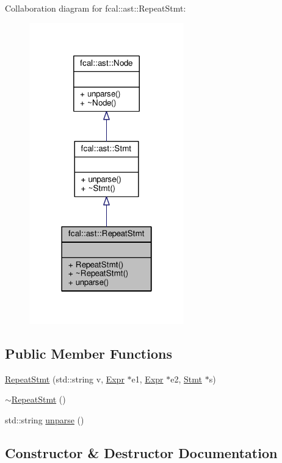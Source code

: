 Collaboration diagram for fcal\+:\+:ast\+:\+:Repeat\+Stmt\+:
\nopagebreak
\begin{figure}[H]
\begin{center}
\leavevmode
\includegraphics[width=190pt]{classfcal_1_1ast_1_1RepeatStmt__coll__graph}
\end{center}
\end{figure}
\subsection*{Public Member Functions}
\begin{DoxyCompactItemize}
\item 
\hyperlink{classfcal_1_1ast_1_1RepeatStmt_a556d042120f16dc84b7c0a4145f6b31b}{Repeat\+Stmt} (std\+::string v, \hyperlink{classfcal_1_1ast_1_1Expr}{Expr} $\ast$e1, \hyperlink{classfcal_1_1ast_1_1Expr}{Expr} $\ast$e2, \hyperlink{classfcal_1_1ast_1_1Stmt}{Stmt} $\ast$s)
\item 
\hyperlink{classfcal_1_1ast_1_1RepeatStmt_aa31754333487bfcf678f0045993c15de}{$\sim$\+Repeat\+Stmt} ()
\item 
std\+::string \hyperlink{classfcal_1_1ast_1_1RepeatStmt_a29fc58ac93a3b92cb2d5e83047f94fb6}{unparse} ()
\end{DoxyCompactItemize}


\subsection{Constructor \& Destructor Documentation}
